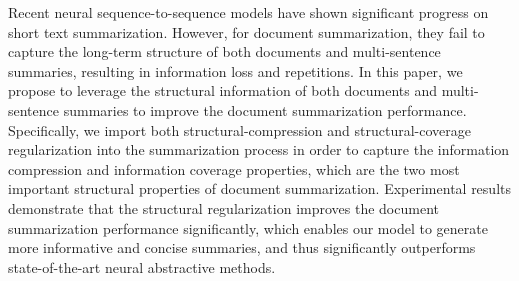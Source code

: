 Recent neural sequence-to-sequence models have shown significant progress on short text summarization. However, for document summarization, they fail to capture the long-term structure of both documents and multi-sentence summaries, resulting in information loss and repetitions. In this paper, we propose to leverage the structural information of both documents and multi-sentence summaries to improve the document summarization performance. Specifically, we import both structural-compression and structural-coverage regularization into the summarization process in order to capture the information compression and information coverage properties, which are the two most important structural properties of document summarization. Experimental results demonstrate that the structural regularization improves the document summarization performance significantly, which enables our model to generate more informative and concise summaries, and thus significantly outperforms state-of-the-art neural abstractive methods.
